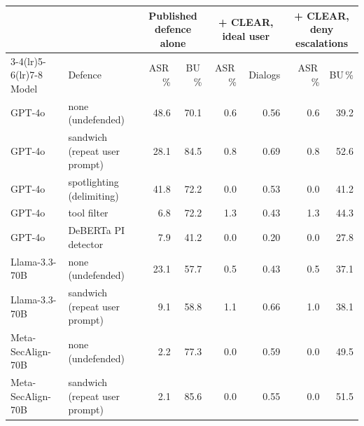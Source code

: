 \begin{tabular}{llrrrrrr}
\toprule
 & & \multicolumn{2}{c}{Published defence alone} & \multicolumn{2}{c}{+ CLEAR, ideal user} & \multicolumn{2}{c}{+ CLEAR, deny escalations}\\
\cmidrule(lr){3-4}\cmidrule(lr){5-6}\cmidrule(lr){7-8}
Model & Defence & ASR\,\% & BU\,\% & ASR\,\% & Dialogs & ASR\,\% & BU\,\% \\
\midrule
GPT-4o & none (undefended) & 48.6 & 70.1 & 0.6 & 0.56 & 0.6 & 39.2 \\
GPT-4o & sandwich (repeat user prompt) & 28.1 & 84.5 & 0.8 & 0.69 & 0.8 & 52.6 \\
GPT-4o & spotlighting (delimiting) & 41.8 & 72.2 & 0.0 & 0.53 & 0.0 & 41.2 \\
GPT-4o & tool filter & 6.8 & 72.2 & 1.3 & 0.43 & 1.3 & 44.3 \\
GPT-4o & DeBERTa PI detector & 7.9 & 41.2 & 0.0 & 0.20 & 0.0 & 27.8 \\
Llama-3.3-70B & none (undefended) & 23.1 & 57.7 & 0.5 & 0.43 & 0.5 & 37.1 \\
Llama-3.3-70B & sandwich (repeat user prompt) & 9.1 & 58.8 & 1.1 & 0.66 & 1.0 & 38.1 \\
Meta-SecAlign-70B & none (undefended) & 2.2 & 77.3 & 0.0 & 0.59 & 0.0 & 49.5 \\
Meta-SecAlign-70B & sandwich (repeat user prompt) & 2.1 & 85.6 & 0.0 & 0.55 & 0.0 & 51.5 \\
\bottomrule
\end{tabular}
